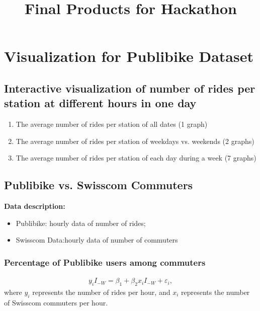 \documentclass{article}
\title{Final Products for Hackathon}
\begin{document}
\maketitle

\section{Visualization for Publibike Dataset}
\subsection{Interactive visualization of number of rides per station at different hours in one day}
\begin{enumerate}
    \item The average number of rides per station of all dates (1 graph)
    \item The average number of rides per station of weekdays vs. weekends (2 graphs)
    \item The average number of rides per station of each day during a week (7 graphs)
\end{enumerate}

\subsection{Publibike vs. Swisscom Commuters}
\textbf{Data description:} 
\begin{itemize}
    \item Publibike: hourly data of number of rides; 
    \item Swisscom Data:hourly data of number of commuters
\end{itemize}
\subsubsection{Percentage of Publibike users among commuters}
\begin{align}
    y_i I_{-W} = \beta_1 + \beta_2 x_i I_{-W} + \varepsilon_i, \label{model1}
\end{align}
where $y_i$ represents the number of rides per hour, and $x_i$ represents the number of Swisscom commuters per hour.\\
\end{document}
